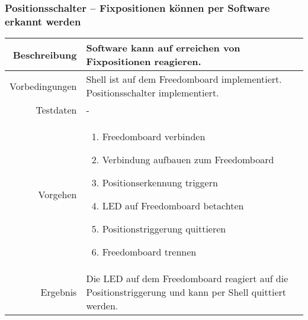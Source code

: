 \newpage
\subsubsection{Positionsschalter -- Fixpositionen können per Software erkannt werden}
\begin{table}[h!]
	\renewcommand{\arraystretch}{1.5}
	\begin{tabular}{|r|p{14cm}|}
		\hline Beschreibung	&
			Software kann auf erreichen von Fixpositionen reagieren. \\ 
		\hline Vorbedingungen	&
			Shell ist auf dem Freedomboard implementiert.
			Positionsschalter implementiert. \\ 
		\hline Testdaten	& - \\ 
		\hline Vorgehen		& 
		\begin{enumerate}
			\item Freedomboard verbinden
			\item Verbindung aufbauen zum Freedomboard
			\item Positionserkennung triggern
			\item LED auf Freedomboard betachten
			\item Positionstriggerung quittieren
			\item Freedomboard trennen
		\end{enumerate} \\ 
		\hline Ergebnis 	&
			Die LED auf dem Freedomboard reagiert auf die
			Positionstriggerung und kann per Shell quittiert werden.\\ 
		\hline 
	\end{tabular}
\end{table}

\newpage
